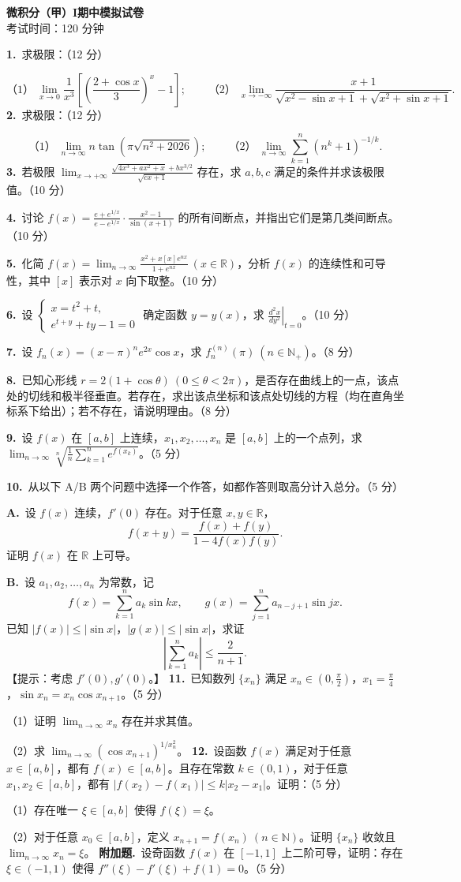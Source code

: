 \documentclass[11pt,a4paper]{ctexart}
\newcommand{\question}[2]{\textbf{#1.}\ #2\par}
\begin{document}
\begin{center}
{\Large\bfseries 微积分（甲）I期中模拟试卷}\\[8pt]
考试时间：120 分钟
\end{center}
\question{1}{求极限：（12 分）}
\[
\text{（1）}\ \lim_{x\to0}\frac{1}{x^3}\left[\left(\frac{2+\cos x}{3}\right)^x-1\right];
\qquad
\text{（2）}\ \lim_{x\to-\infty}\frac{x+1}{\sqrt{x^2-\sin x+1}+\sqrt{x^2+\sin x+1}}.
\]
\vfill
\question{2}{求极限：（12 分）}
\[
\text{（1）}\ \lim_{n\to\infty}n\tan\!\left(\pi\sqrt{n^2+2026}\right);
\qquad
\text{（2）}\ \lim_{n\to\infty}\sum_{k=1}^n(n^k+1)^{-1/k}.
\]
\vfill
\question{3}{若极限 $\displaystyle\lim_{x\to+\infty}\frac{\sqrt{4x^3+ax^2+x}+bx^{3/2}}{\sqrt{cx+1}}$ 存在，求 $a,b,c$ 满足的条件并求该极限值。（10 分）}
\vfill
\newpage
\question{4}{讨论 $\displaystyle f(x)=\frac{e+e^{1/x}}{e-e^{1/x}}\cdot\frac{x^2-1}{\sin(x+1)}$ 的所有间断点，并指出它们是第几类间断点。（10 分）}
\vfill
\question{5}{化简 $\displaystyle f(x)=\lim_{n\to\infty}\frac{x^2+x[x]e^{nx}}{1+e^{nx}}\ (x\in\mathbb R)$，分析 $f(x)$ 的连续性和可导性，其中 $[x]$ 表示对 $x$ 向下取整。（10 分）}
\vfill
\question{6}{设 $\begin{cases}x=t^2+t,\\e^{t+y}+ty-1=0\end{cases}$ 确定函数 $y=y(x)$，求 $\displaystyle\left.\frac{d^2x}{dy^2}\right|_{t=0}$。（10 分）}
\vfill
\newpage
\question{7}{设 $f_n(x)=(x-\pi)^ne^{2x}\cos x$，求 $f_n^{(n)}(\pi)\ (n\in\mathbb N_+)$。（8 分）}
\vfill
\question{8}{已知心形线 $r=2(1+\cos\theta)\ (0\le\theta<2\pi)$，是否存在曲线上的一点，该点处的切线和极半径垂直。若存在，求出该点坐标和该点处切线的方程（均在直角坐标系下给出）；若不存在，请说明理由。（8 分）}
\vfill
\question{9}{设 $f(x)$ 在 $[a,b]$ 上连续，$x_1,x_2,\ldots,x_n$ 是 $[a,b]$ 上的一个点列，求 $\displaystyle\lim_{n\to\infty}\sqrt[n]{\frac1n\sum_{k=1}^ne^{f(x_k)}}$。（5 分）}
\vfill
\newpage
\question{10}{从以下 A/B 两个问题中选择一个作答，如都作答则取高分计入总分。（5 分）}
\textbf{A.}\ 设 $f(x)$ 连续，$f'(0)$ 存在。对于任意 $x,y\in\mathbb R$，
\[
f(x+y)=\frac{f(x)+f(y)}{1-4f(x)f(y)}.
\]
证明 $f(x)$ 在 $\mathbb R$ 上可导。

\textbf{B.}\ 设 $a_1,a_2,\ldots,a_n$ 为常数，记
\[
f(x)=\sum_{k=1}^na_k\sin kx,\qquad g(x)=\sum_{j=1}^na_{n-j+1}\sin jx.
\]
已知 $|f(x)|\le|\sin x|$，$|g(x)|\le|\sin x|$，求证
\[
\left|\sum_{k=1}^na_k\right|\le\frac{2}{n+1}.
\]
【提示：考虑 $f'(0),g'(0)$。】
\vfill
\question{11}{已知数列 $\{x_n\}$ 满足 $x_n\in(0,\frac\pi2)$，$x_1=\frac\pi4$，$\sin x_n=x_n\cos x_{n+1}$。（5 分）}
（1）证明 $\displaystyle\lim_{n\to\infty}x_n$ 存在并求其值。

（2）求 $\displaystyle\lim_{n\to\infty}(\cos x_{n+1})^{1/x_n^2}$。
\vfill
\newpage
\question{12}{设函数 $f(x)$ 满足对于任意 $x\in[a,b]$，都有 $f(x)\in[a,b]$。且存在常数 $k\in(0,1)$，对于任意 $x_1,x_2\in[a,b]$，都有 $|f(x_2)-f(x_1)|\le k|x_2-x_1|$。证明：（5 分）}
（1）存在唯一 $\xi\in[a,b]$ 使得 $f(\xi)=\xi$。

（2）对于任意 $x_0\in[a,b]$，定义 $x_{n+1}=f(x_n)\ (n\in\mathbb N)$。证明 $\{x_n\}$ 收敛且 $\displaystyle\lim_{n\to\infty}x_n=\xi$。
\vfill
\textbf{附加题.}\ 设奇函数 $f(x)$ 在 $[-1,1]$ 上二阶可导，证明：存在 $\xi\in(-1,1)$ 使得 $f''(\xi)-f'(\xi)+f(1)=0$。（5 分）
\vfill
\end{document}
